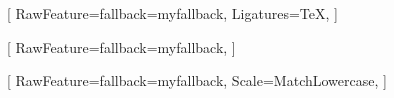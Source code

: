 \usepackage{fontspec}
\usepackage{luaotfload}



\setmainfont{Noto Serif}[
  RawFeature={fallback=myfallback},
  Ligatures=TeX,
]

\setsansfont{Noto Sans}[
  RawFeature={fallback=myfallback},
]

\setmonofont{Noto Sans Mono}[
  RawFeature={fallback=myfallback},
  Scale=MatchLowercase,
]

